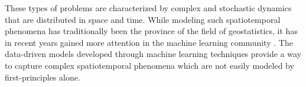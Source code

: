 




These types of problems are characterized by complex and stochastic dynamics that are distributed in space and time. %
While modeling such spatiotemporal phenomena has traditionally been the province of the field of geostatistics, it has in recent years gained more attention in the machine learning community \cite{cressie2011statistics}. The data-driven models developed through machine learning techniques provide a way to capture complex spatiotemporal phenomena which are not easily modeled by first-principles alone. 


